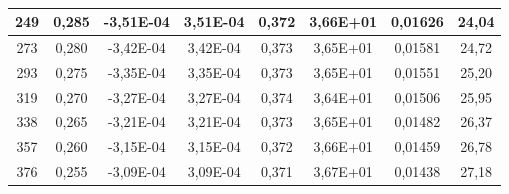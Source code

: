 \begin{table}[H]
\begin{tabular}{|c|c|c|c|c|c|c|c|}
		249 & 0,285 & -3,51E-04 & 3,51E-04 & 0,372 & 3,66E+01 & 0,01626 & 24,04 \\ \hline
		273 & 0,280 & -3,42E-04 & 3,42E-04 & 0,373 & 3,65E+01 & 0,01581 & 24,72 \\ \hline
		293 & 0,275 & -3,35E-04 & 3,35E-04 & 0,373 & 3,65E+01 & 0,01551 & 25,20 \\ \hline
		319 & 0,270 & -3,27E-04 & 3,27E-04 & 0,374 & 3,64E+01 & 0,01506 & 25,95 \\ \hline
		338 & 0,265 & -3,21E-04 & 3,21E-04 & 0,373 & 3,65E+01 & 0,01482 & 26,37 \\ \hline
		357 & 0,260 & -3,15E-04 & 3,15E-04 & 0,372 & 3,66E+01 & 0,01459 & 26,78 \\ \hline
		376 & 0,255 & -3,09E-04 & 3,09E-04 & 0,371 & 3,67E+01 & 0,01438 & 27,18 \\ \hline
		\end{tabular}
	\caption{}
\label{tabelakynch}
\end{table}
		

